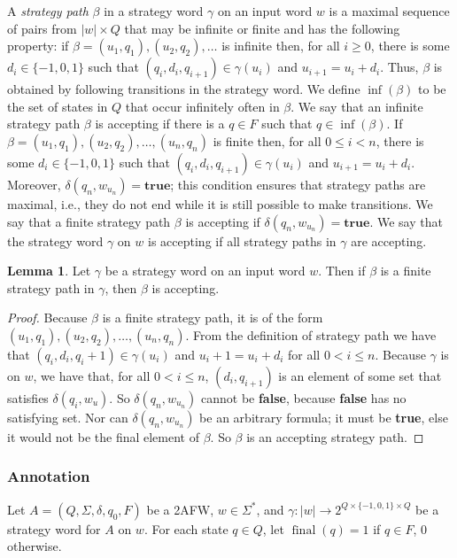 \documentclass{lmcs}
\theoremstyle{definition}
\newtheorem{lemma}[thm]{Lemma}
\DeclareMathOperator{\?}{?}
\DeclareMathOperator{\final}{final}
\begin{document}
A \textit{strategy path} $\beta$ in a strategy word $\gamma$ on an input word $w$ is a maximal sequence of pairs
from $|w| \times Q$ that may be infinite
or finite and has the following property: if $\beta = (u_1,q_1), (u_2,q_2),\ldots$ is infinite then, for all $i \geq 0$,
there is some $d_i \in \{-1,0,1\}$ such that $(q_i,d_i,q_{i+1}) \in \gamma(u_i)$ and $u_{i+1} = u_i + d_i$.
Thus, $\beta$ is obtained by following transitions in the strategy word. We define
$\inf(\beta)$ to be the set of states in $Q$ that occur infinitely often in $\beta$. We say that an infinite strategy path $\beta$ is
accepting if there is a $q \in F$ such that $q \in \inf(\beta)$.
If $\beta = (u_1,q_1),(u_2,q_2),\ldots,(u_n,q_n)$ is finite then, for all $0 \leq i < n$, there is
some $d_i \in \{-1,0,1\}$ such that $(q_i,d_i,q_{i+1}) \in \gamma(u_i)$ and $u_{i+1} = u_i + d_i$.
Moreover, $\delta(q_n,w_{u_n}) = \textbf{true}$; this condition ensures that strategy paths are maximal, i.e., they do not end while it is still possible
to make transitions. We say that a finite strategy path $\beta$
is accepting if $\delta(q_n,w_{u_n}) = \textbf{true}$. We say that the strategy word $\gamma$ on $w$ is accepting if all strategy paths in $\gamma$ are accepting.

\begin{lemma}
Let $\gamma$ be a strategy word on an input word $w$. Then if $\beta$ is a finite strategy path in $\gamma$, then $\beta$ is accepting.
\end{lemma}
\begin{proof}
Because $\beta$ is a finite strategy path, it is of the form $(u_1,q_1),(u_2,q_2),\ldots,(u_n,q_n)$. From the definition of strategy path we have that $(q_i,d_i,q_i+1) \in \gamma(u_i)$ and $u_i+1 = u_i + d_i$ for all $0 < i \leq n$. Because $\gamma$ is on $w$, we have that, for all $0 < i \leq n$, $(d_i,q_{i+1})$ is an element of some set that satisfies $\delta(q_i,w_u)$. So $\delta(q_n,w_{u_n})$ cannot be \textbf{false}, because \textbf{false} has no satisfying set. Nor can $\delta(q_n,w_{u_n})$ be an arbitrary formula; it must be \textbf{true}, else it would not be the final element of $\beta$. So $\beta$ is an accepting strategy path.
\end{proof}



\subsubsection{Annotation}
Let $A = (Q,\Sigma,\delta,q_0,F)$ be a 2AFW, $w \in \Sigma^*$, and $\gamma : |w| \rightarrow 2^{Q \times \{-1,0,1\} \times Q}$ be a
strategy word for $A$ on $w$. For each state $q \in Q$, let $\final(q) = 1$ if $q \in F$, $0$ otherwise.
\end{document}
